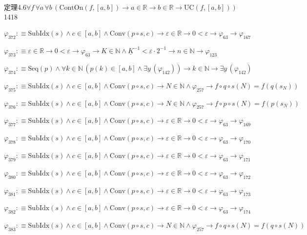 \begin{fullproof}{定理4.6}{$\forall f\,\forall a\,\forall b\,(\mathrm{ContOn}(f,[a,b]) \to a \in \mathbb{R} \to b \in \mathbb{R} \to \mathrm{UC}(f,[a,b]))$}{1418}
\begin{abbrevlist}
\item $\varphi_{372} :\equiv \mathrm{SubIdx}(s) \land c \in [a,b] \land \mathrm{Conv}(p \circ s,c) \to \varepsilon \in \mathbb{R} \to 0 < \varepsilon \to \varphi_{63} \to \varphi_{167}$
\item $\varphi_{373} :\equiv \varepsilon \in \mathbb{R} \to 0 < \varepsilon \to \varphi_{63} \to K \in \mathbb{N} \land \underline{K}^{-1} < \varepsilon \cdot 2^{-1} \to n \in \mathbb{N} \to \varphi_{123}$
\item $\varphi_{374} :\equiv \mathrm{Seq}(p) \land \forall k \in \mathbb{N}\,(p(k) \in [a,b] \land \exists y\,(\varphi_{142})) \to k \in \mathbb{N} \to \exists y\,(\varphi_{142})$
\item $\varphi_{375} :\equiv \mathrm{SubIdx}(s) \land c \in [a,b] \land \mathrm{Conv}(p \circ s,c) \to N \in \mathbb{N} \land \varphi_{257} \to f \circ q \circ s(N) = f(q(s_{N}))$
\item $\varphi_{376} :\equiv \mathrm{SubIdx}(s) \land c \in [a,b] \land \mathrm{Conv}(p \circ s,c) \to N \in \mathbb{N} \land \varphi_{257} \to f \circ p \circ s(N) = f(p(s_{N}))$
\item $\varphi_{377} :\equiv \mathrm{SubIdx}(s) \land c \in [a,b] \land \mathrm{Conv}(p \circ s,c) \to \varepsilon \in \mathbb{R} \to 0 < \varepsilon \to \varphi_{63} \to \varphi_{169}$
\item $\varphi_{378} :\equiv \mathrm{SubIdx}(s) \land c \in [a,b] \land \mathrm{Conv}(p \circ s,c) \to \varepsilon \in \mathbb{R} \to 0 < \varepsilon \to \varphi_{63} \to \varphi_{170}$
\item $\varphi_{379} :\equiv \mathrm{SubIdx}(s) \land c \in [a,b] \land \mathrm{Conv}(p \circ s,c) \to \varepsilon \in \mathbb{R} \to 0 < \varepsilon \to \varphi_{63} \to \varphi_{171}$
\item $\varphi_{380} :\equiv \mathrm{SubIdx}(s) \land c \in [a,b] \land \mathrm{Conv}(p \circ s,c) \to \varepsilon \in \mathbb{R} \to 0 < \varepsilon \to \varphi_{63} \to \varphi_{172}$
\item $\varphi_{381} :\equiv \mathrm{SubIdx}(s) \land c \in [a,b] \land \mathrm{Conv}(p \circ s,c) \to \varepsilon \in \mathbb{R} \to 0 < \varepsilon \to \varphi_{63} \to \varphi_{173}$
\item $\varphi_{382} :\equiv \mathrm{SubIdx}(s) \land c \in [a,b] \land \mathrm{Conv}(p \circ s,c) \to \varepsilon \in \mathbb{R} \to 0 < \varepsilon \to \varphi_{63} \to \varphi_{174}$
\item $\varphi_{383} :\equiv \mathrm{SubIdx}(s) \land c \in [a,b] \land \mathrm{Conv}(p \circ s,c) \to N \in \mathbb{N} \land \varphi_{257} \to f \circ q \circ s(N) = f(q \circ s(N))$

\end{abbrevlist}
\end{fullproof}
